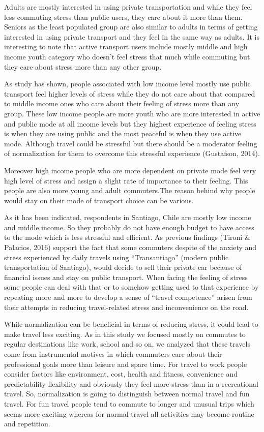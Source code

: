 \documentclass[
11pt, %
oneside, %
english, %
singlespacing, %
]{macthesis} %
\begin{document}
Adults are mostly interested in using private transportation and while they feel less commuting stress than public users, they care about it more than them. Seniors as the least populated group are also similar to adults in terms of getting interested in using private transport and they feel in the same way as adults. It is interesting to note that active transport users include mostly middle and high income youth category who doesn't feel stress that much while commuting but they care about stress more than any other group.

As study has shown, people associated with low income level mostly use public transport feel higher levels of stress while they do not care about that compared to middle income ones who care about their feeling of stress more than any group. These low income people are more youth who are more interested in active and public mode at all income levels but they highest experience of feeling stress is when they are using public and the most peaceful is when they use active mode. Although travel could be stressful but there should be a moderator feeling of normalization for them to overcome this stressful experience (Gustafson, 2014).

Moreover high income people who are more dependent on private mode feel very high level of stress and assign a slight rate of importance to their feeling. This people are also more young and adult commuters.The reason behind why people would stay on their mode of transport choice can be various.

As it has been indicated, respondents in Santiago, Chile are mostly low income and middle income. So they probably do not have enough budget to have access to the mode which is less stressful and efficient. As previous findings (Tironi \& Palacios, 2016) support the fact that some commuters despite of the anxiety and stress experienced by daily travels using ``Transantiago'' (modern public transportation of Santiago), would decide to sell their private car because of financial issues and stay on public transport. When facing the feeling of stress some people can deal with that or to somehow getting used to that experience by repeating more and more to develop a sense of ``travel competence'' arisen from their attempts in reducing travel-related stress and inconvenience on the road.

While normalization can be beneficial in terms of reducing stress, it could lead to make travel less exciting. As in this study we focused mostly on commutes to regular destinations like work, school and so on, we analyzed that these travels come from instrumental motives in which commuters care about their professional goals more than leisure and spare time. For travel to work people consider factors like environment, cost, health and fitness, convenience and predictability flexibility and obviously they feel more stress than in a recreational travel. So, normalization is going to distinguish between normal travel and fun travel. For fun travel people tend to commute to longer and unusual trips which seems more exciting whereas for normal travel all activities may become routine and repetition.
\end{document}
